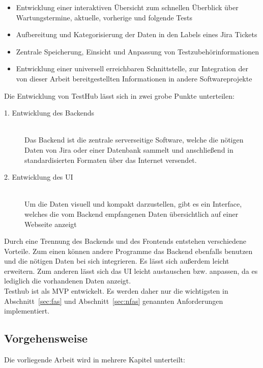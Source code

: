 \begin{itemize}
\item Entwicklung einer interaktiven Übersicht zum schnellen Überblick über Wartungstermine, aktuelle, vorherige und folgende Tests 
\item Aufbereitung und Kategorisierung der Daten in den Labels eines \gls{Jira} Tickets
\item Zentrale Speicherung, Einsicht und Anpassung von Testzubehörinformationen
\item Entwicklung einer universell erreichbaren Schnittstelle, zur Integration der von dieser Arbeit bereitgestellten Informationen in andere Softwareprojekte

\end{itemize}

Die Entwicklung von TestHub lässt sich in zwei grobe Punkte unterteilen:

\begin{description}

    \item[1. Entwicklung des Backends]\hfill \\
    Das Backend ist die zentrale serverseitige Software, welche die nötigen 
    Daten von \gls{Jira} oder einer Datenbank sammelt und anschließend in standardisierten Formaten über das Internet 
    versendet.
    

    \item[2. Entwicklung des UI]\hfill \\
    Um die Daten visuell und kompakt darzustellen, gibt es ein Interface, 
    welches die vom Backend empfangenen Daten übersichtlich auf einer Webseite
    anzeigt

\end{description}


Durch eine Trennung des \gls{Backend}s und des \gls{Frontend}s entstehen verschiedene 
Vorteile. Zum einen können andere Programme das Backend ebenfalls benutzen und
die nötigen Daten bei sich integrieren. Es lässt sich außerdem leicht erweitern.
Zum anderen lässt sich das \gls{UI} leicht austauschen bzw. anpassen, da es lediglich 
die vorhandenen Daten anzeigt. \\

Testhub ist als \gls{MVP} entwickelt. Es werden daher nur die wichtigsten in 
Abschnitt~\ref{sec:fas} und Abschnitt~\ref{sec:nfas} genannten Anforderungen implementiert.


\subsection{Vorgehensweise}
Die vorliegende Arbeit wird in mehrere Kapitel unterteilt:

